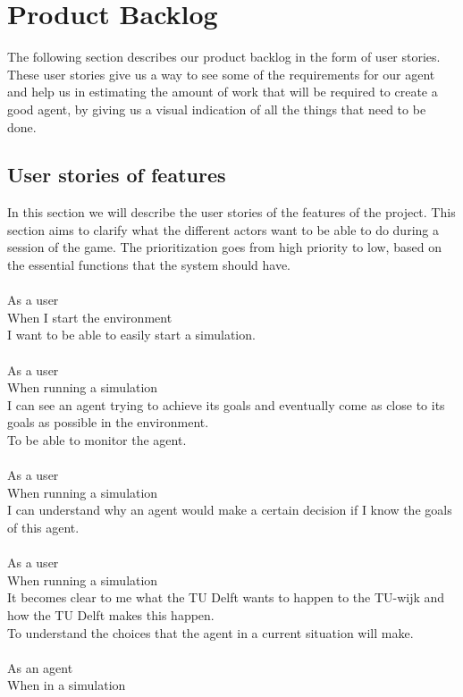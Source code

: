 \section{Product Backlog}
The following section describes our product backlog in the form of user stories. These user stories give us a way to see some of the requirements for our agent and help us in estimating the amount of work that will be required to create a good agent, by giving us a visual indication of all the things that need to be done.
\subsection{User stories of features}

In this section we will describe the user stories of the features of the project. This section aims to clarify what the different actors want to be able to do during a session of the game. The prioritization goes from high priority to low, based on the essential functions that the system should have.\\
\\
As a user\\
When I start the environment\\
I want to be able to easily start a simulation.\\
\\
As a user\\
When running a simulation\\
I can see an agent trying to achieve its goals and eventually come as close to its goals as possible in the environment.\\
To be able to monitor the agent.\\
\\
As a user\\
When running a simulation\\
I can understand why an agent would make a certain decision if I know the goals of this agent.\\
\\
As a user\\
When running a simulation\\
It becomes clear to me what the TU Delft wants to happen to the TU-wijk and how the TU Delft makes this happen.\\
To understand the choices that the agent in a current situation will make.\\
\\
As an agent\\
When in a simulation\\
